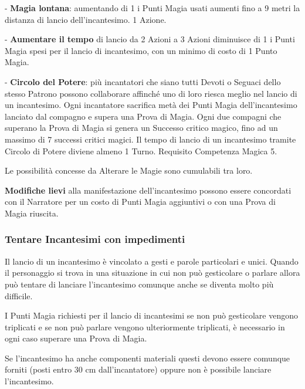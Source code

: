 \begin{multicols}{2}
- \textbf{Magia lontana}: aumentando di 1 i Punti Magia usati aumenti fino a 9 metri la distanza di lancio dell'incantesimo. 1 Azione.

- \textbf{Aumentare il tempo} di lancio da 2 Azioni a 3 Azioni diminuisce di 1 i Punti Magia spesi per il lancio di incantesimo, con un minimo di costo di 1 Punto Magia.

- \textbf{Circolo del Potere}: più incantatori che siano tutti Devoti o Seguaci dello stesso Patrono possono collaborare affinché uno di loro riesca meglio nel lancio di un incantesimo.
Ogni incantatore sacrifica metà dei Punti Magia dell'incantesimo lanciato dal compagno e supera una Prova di Magia. Ogni due compagni che superano la Prova di Magia si genera un Successo critico magico, fino ad un massimo di 7 successi critici magici. Il tempo di lancio di un incantesimo tramite Circolo di Potere diviene almeno 1 Turno. Requisito Competenza Magica 5.

\medskip

Le possibilità concesse da Alterare le Magie sono cumulabili tra loro.

\medskip

\textbf{Modifiche lievi}  alla manifestazione dell'incantesimo possono essere concordati con il Narratore per un costo di Punti Magia aggiuntivi o con una Prova di Magia riuscita.


\subsubsection{Tentare Incantesimi con impedimenti} \label{magieconimpedimenti}\hypertarget{magieconimpedimenti}{} 

Il lancio di un incantesimo è vincolato a gesti e parole particolari e unici. Quando il personaggio si trova in una situazione in cui non può gesticolare o parlare allora può tentare di lanciare l'incantesimo comunque anche se diventa molto più difficile.

I Punti Magia richiesti per il lancio di incantesimi se non può gesticolare vengono triplicati e se non può parlare vengono ulteriormente triplicati, è necessario in ogni caso superare una Prova di Magia.

Se l'incantesimo ha anche componenti materiali questi devono essere comunque forniti (posti entro 30 cm dall'incantatore) oppure non è possibile lanciare l'incantesimo.


\end{multicols}
